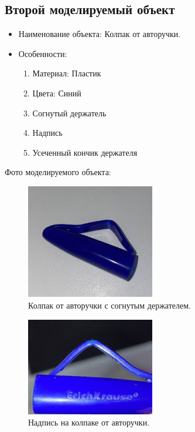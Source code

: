 \documentclass[areasetadvanced]{scrartcl}
\begin{document}
\subsection{Второй моделируемый объект}
\begin{itemize}
    \item Наименование объекта: Колпак от авторучки.
	\item Особенности: \begin{enumerate}
        \item Материал: Пластик
        \item Цвета: Синий
        \item Согнутый держатель 
        \item Надпись
        \item Усеченный кончик держателя
    \end{enumerate}
\end{itemize}
Фото моделируемого объекта:
\begin{figure}[H]
    \centering
    \includegraphics[width=0.5\textwidth]{Kolpak_org.png}
    \caption{Колпак от авторучки с согнутым держателем.}
    \label{fig:syntdiag}
\end{figure}
\begin{figure}[H]
    \centering
    \includegraphics[width=0.5\textwidth]{KolpakName.png}
    \caption{Надпись на колпаке от авторучки.}
    \label{fig:syntdiag}
\end{figure}
\end{document}
